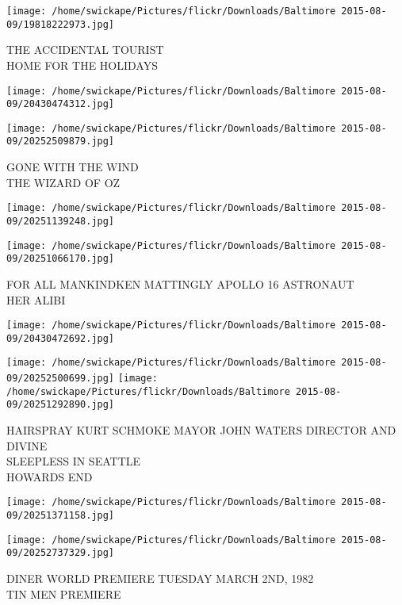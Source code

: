 \documentclass[10pt,letterpaper]{article}
\begin{document}
\vspace{0.25in}
\texttt{[image: /home/swickape/Pictures/flickr/Downloads/Baltimore 2015-08-09/19818222973.jpg]}

THE ACCIDENTAL TOURIST\\
HOME FOR THE HOLIDAYS
\pagebreak

\texttt{[image: /home/swickape/Pictures/flickr/Downloads/Baltimore 2015-08-09/20430474312.jpg]}

\vspace{0.25in}
\texttt{[image: /home/swickape/Pictures/flickr/Downloads/Baltimore 2015-08-09/20252509879.jpg]}

GONE WITH THE WIND\\
THE WIZARD OF OZ
\pagebreak

\texttt{[image: /home/swickape/Pictures/flickr/Downloads/Baltimore 2015-08-09/20251139248.jpg]}

\vspace{0.25in}
\texttt{[image: /home/swickape/Pictures/flickr/Downloads/Baltimore 2015-08-09/20251066170.jpg]}

FOR ALL MANKINDKEN MATTINGLY APOLLO 16 ASTRONAUT\\
HER ALIBI
\pagebreak

\texttt{[image: /home/swickape/Pictures/flickr/Downloads/Baltimore 2015-08-09/20430472692.jpg]}

\vspace{0.25in}
\texttt{[image: /home/swickape/Pictures/flickr/Downloads/Baltimore 2015-08-09/20252500699.jpg]}
\texttt{[image: /home/swickape/Pictures/flickr/Downloads/Baltimore 2015-08-09/20251292890.jpg]}

HAIRSPRAY KURT SCHMOKE MAYOR JOHN WATERS DIRECTOR AND DIVINE\\
SLEEPLESS IN SEATTLE\\
HOWARDS END
\pagebreak

\texttt{[image: /home/swickape/Pictures/flickr/Downloads/Baltimore 2015-08-09/20251371158.jpg]}

\vspace{0.25in}
\texttt{[image: /home/swickape/Pictures/flickr/Downloads/Baltimore 2015-08-09/20252737329.jpg]}

DINER WORLD PREMIERE TUESDAY MARCH 2ND, 1982\\
TIN MEN PREMIERE
\pagebreak
\end{document}
